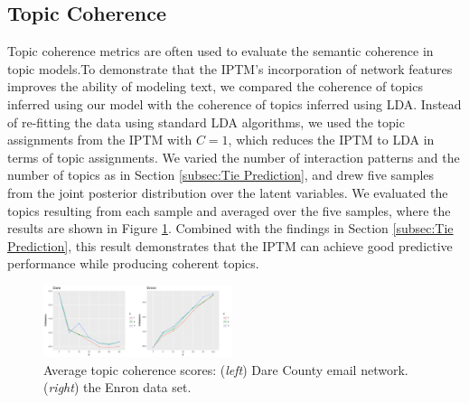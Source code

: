 \documentclass{article}
\begin{document}
 	   \subsection{Topic Coherence}\label{subsec:Topic Coherence}
 	   Topic coherence metrics \cite{mimno2011optimizing} are often used to evaluate the semantic coherence in topic models.To demonstrate that the IPTM's incorporation of network features improves the ability of modeling text, we compared the coherence of topics inferred using our model with the coherence of topics inferred using LDA. Instead of re-fitting the data using standard LDA algorithms, we used the topic assignments from the IPTM with $C=1$, which reduces the IPTM to LDA in terms of topic assignments. We varied the number of interaction patterns and the number of topics as in Section \ref{subsec:Tie Prediction}, and drew five samples from the joint posterior distribution over the latent variables. We evaluated the topics resulting from each sample and averaged over the five samples, where the results are shown in Figure \ref{fig:topic}. Combined with the findings in Section \ref{subsec:Tie Prediction}, this result demonstrates that the IPTM can achieve good predictive performance while producing coherent topics. 
 	   \begin{figure}[h]
 	   	\centering
 	   	\includegraphics[width = 0.49\textwidth]{plots/topicplot.pdf}
 	   	\caption{Average topic coherence scores: (\textit{left}) Dare County email network. (\textit{right}) the Enron data set.}
 	   	\label{fig:topic}
 	   \end{figure}
\end{document}
